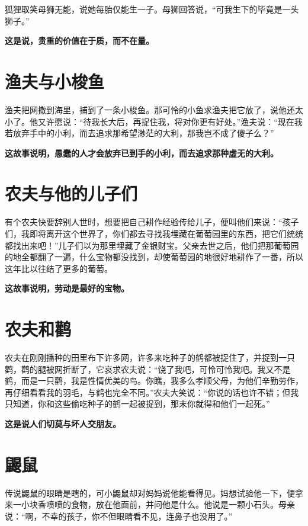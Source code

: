 狐狸取笑母狮无能，说她每胎仅能生一子。母狮回答说，“可我生下的毕竟是一头狮子。”

{\bfseries \color{red}这是说，贵重的价值在于质，而不在量。}

\section{渔夫与小梭鱼}

渔夫把网撒到海里，捕到了一条小梭鱼。那可怜的小鱼求渔夫把它放了，说他还太小了。他又许愿说：“待我长大后，再捉住我，将对你更有好处。”渔夫说：“现在我若放弃手中的小利，而去追求那希望渺茫的大利，那我岂不成了傻子么？”

{\bfseries \color{red}这故事说明，愚蠢的人才会放弃已到手的小利，而去追求那种虚无的大利。}

\section{农夫与他的儿子们}

有个农夫快要辞别人世时，想要把自己耕作经验传给儿子，便叫他们来说：“孩子们，我即将离开这个世界了，你们都去寻找我埋藏在葡萄园里的东西，把它们统统都找出来吧！”儿子们以为那里埋藏了金银财宝。父亲去世之后，他们把那葡萄园的地全都翻了一遍，什么宝物都没找到，却使葡萄园的地很好地耕作了一番，所以这年比以往结了更多的葡萄。

{\bfseries \color{red}这故事说明，劳动是最好的宝物。}

\section{农夫和鹳}

农夫在刚刚播种的田里布下许多网，许多来吃种子的鹤都被捉住了，并捉到一只鹳，鹳的腿被网折断了，它哀求农夫说：“饶了我吧，可怜可怜我吧。我又不是鹤，而是一只鹳，我是性情优美的鸟。你瞧，我多么孝顺父母，为他们辛勤劳作，再仔细看看我的羽毛，与鹤也完全不同。”农夫大笑说：“你说的话也许不错；但我只知道，你和这些偷吃种子的鹤一起被捉到，那末你就得和他们一起死。”

{\bfseries \color{red}这是说人们切莫与坏人交朋友。}

\section{鼹鼠}

传说鼹鼠的眼睛是瞎的，可小鼹鼠却对妈妈说他能看得见。妈想试验他一下，便拿来一小块香喷喷的食物，放在他面前，并问他是什么。他说是一颗小石头。母亲说：“啊，不幸的孩子，你不但眼睛看不见，连鼻子也没用了。”

